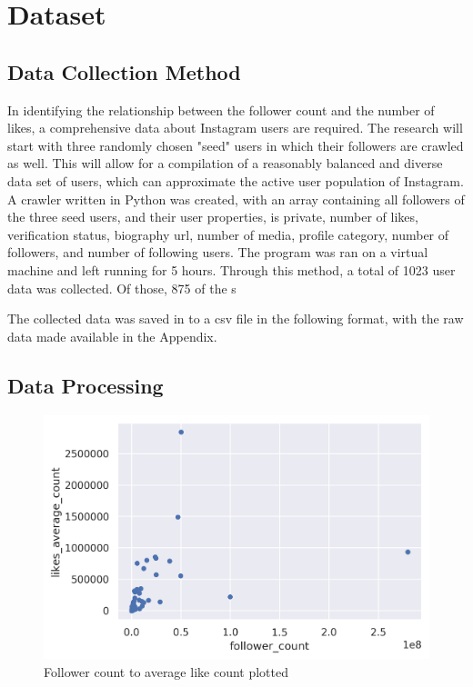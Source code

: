\documentclass[11pt]{article}
\begin{document}
\section{Dataset}\label{section-dataset}

\subsection{Data Collection Method}

In identifying the relationship between the follower count and the number of likes, a comprehensive data about Instagram users are required. The research will start with three randomly chosen "seed" users in which their followers are crawled as well. This will allow for a compilation of a reasonably balanced and diverse data set of users, which can approximate the active user population of Instagram. A crawler written in Python was created, with an array containing all followers of the three seed users, and their user properties, is private, number of likes, verification status, biography url, number of media, profile category, number of followers, and number of following users. The program was ran on a virtual machine and left running for 5 hours. Through this method, a total of 1023 user data was collected. Of those, 875 of the s

The collected data was saved in to a csv file in the following format, with the raw data made available in the Appendix.

\subsection{Data Processing}
\begin{figure}[H]
  \center
  \includegraphics[width=0.75\linewidth]{images/row_data_graph.png}
  \caption{Follower count to average like count plotted}
  \label{fig:raw_data}
\end{figure}
\end{document}
